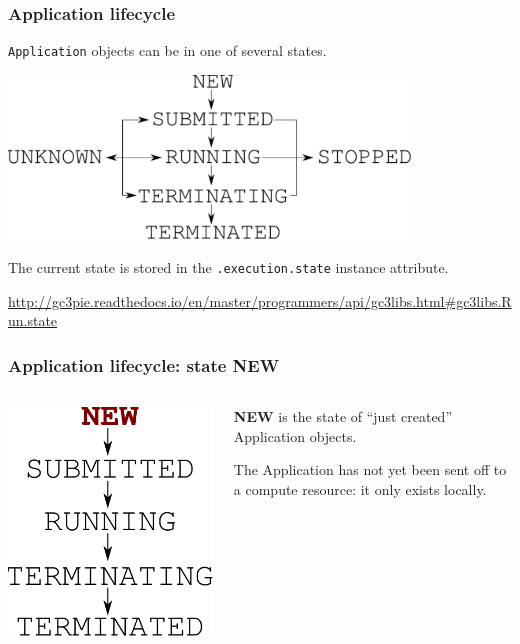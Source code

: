 \documentclass[english,serif,mathserif,xcolor=pdftex,dvipsnames,table]{beamer}
\begin{document}
\begin{frame}[fragile]
\frametitle{Application lifecycle}

\texttt{Application} objects can be in one of several states.
\+
\begin{center}
  \includegraphics[width=0.8\textwidth]{fig/states}
\end{center}
\+
The current state is stored in the \texttt{.execution.state} instance attribute.

\+
\begin{references}
  \url{http://gc3pie.readthedocs.io/en/master/programmers/api/gc3libs.html#gc3libs.Run.state}
\end{references}
\end{frame}

\begin{frame}[fragile]
\frametitle{Application lifecycle: state NEW}
\begin{columns}[c]
  \begin{column}{0.5\textwidth}
    \includegraphics[height=0.7\textheight]{fig/state-NEW}
  \end{column}
  \begin{column}{0.4\textwidth}
    \raggedleft

  \textbf{NEW} is the state of ``just created'' Application objects.

  \+
  The Application has not yet been sent off to a compute resource:
  it only exists locally.
  \end{column}
\end{columns}
\end{frame}
\end{document}
